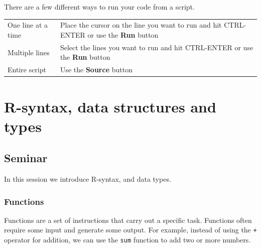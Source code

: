 \documentclass[]{article}
\begin{document}
There are a few different ways to run your code from a script.

\begin{longtable}[]{@{}ll@{}}
\toprule
\endhead
\begin{minipage}[t]{0.23\columnwidth}\raggedright
One line at a time\strut
\end{minipage} & \begin{minipage}[t]{0.71\columnwidth}\raggedright
Place the cursor on the line you want to run and hit CTRL-ENTER or use the \textbf{Run} button\strut
\end{minipage}\tabularnewline
\begin{minipage}[t]{0.23\columnwidth}\raggedright
Multiple lines\strut
\end{minipage} & \begin{minipage}[t]{0.71\columnwidth}\raggedright
Select the lines you want to run and hit CTRL-ENTER or use the \textbf{Run} button\strut
\end{minipage}\tabularnewline
\begin{minipage}[t]{0.23\columnwidth}\raggedright
Entire script\strut
\end{minipage} & \begin{minipage}[t]{0.71\columnwidth}\raggedright
Use the \textbf{Source} button\strut
\end{minipage}\tabularnewline
\bottomrule
\end{longtable}

\hypertarget{r-syntax-data-structures-and-types}{%
\section{R-syntax, data structures and types}\label{r-syntax-data-structures-and-types}}

\hypertarget{seminar}{%
\subsection{Seminar}\label{seminar}}

In this session we introduce R-syntax, and data types.

\hypertarget{functions}{%
\subsubsection{Functions}\label{functions}}

Functions are a set of instructions that carry out a specific task. Functions often require some input and generate some output. For example, instead of using the \texttt{+} operator for addition, we can use the \texttt{sum} function to add two or more numbers.
\end{document}
